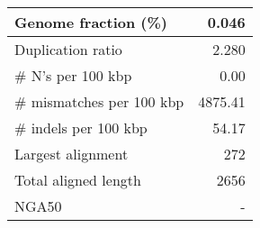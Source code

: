 \documentclass[12pt,a4paper]{article}
\begin{document}
\begin{table}[ht]
\begin{center}
\begin{tabular}{|l*{1}{|r}|}
Genome fraction (\%) & 0.046 \\ \hline
Duplication ratio & 2.280 \\ \hline
\# N's per 100 kbp & 0.00 \\ \hline
\# mismatches per 100 kbp & 4875.41 \\ \hline
\# indels per 100 kbp & 54.17 \\ \hline
Largest alignment & 272 \\ \hline
Total aligned length & 2656 \\ \hline
NGA50 & - \\ \hline
\end{tabular}
\end{center}
\end{table}
\end{document}
